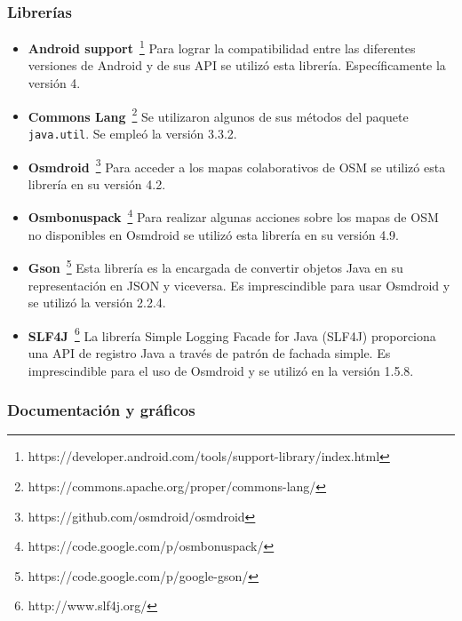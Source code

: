 \subsubsection{Librerías}

\begin{itemize}
  \item \textbf{Android
    support}~\footnote{https://developer.android.com/tools/support-library/index.html} Para lograr
    la compatibilidad entre las diferentes versiones de Android y de sus \acs{API} se utilizó esta
    librería. Específicamente la versión 4.

  \item \textbf{Commons Lang}~\footnote{https://commons.apache.org/proper/commons-lang/} Se
    utilizaron algunos de sus métodos del paquete \texttt{java.util}. Se empleó la versión 3.3.2.

  \item \textbf{Osmdroid}~\footnote{https://github.com/osmdroid/osmdroid} Para acceder a los mapas
    colaborativos de \acs{OSM} se utilizó esta librería en su versión 4.2.

  \item \textbf{Osmbonuspack}~\footnote{https://code.google.com/p/osmbonuspack/} Para realizar
    algunas acciones sobre los mapas de \acs{OSM} no disponibles en Osmdroid se utilizó esta
    librería en su versión 4.9.

  \item \textbf{Gson}~\footnote{https://code.google.com/p/google-gson/} Esta librería es la
    encargada de convertir objetos Java en su representación en JSON y viceversa. Es imprescindible
    para usar Osmdroid y se utilizó la versión 2.2.4.

  \item \textbf{SLF4J}~\footnote{http://www.slf4j.org/} La librería Simple Logging Facade for Java
    (SLF4J) proporciona una \acs{API} de registro Java a través de patrón de fachada simple. Es
    imprescindible para el uso de Osmdroid y se utilizó en la versión 1.5.8.

\end{itemize}

\subsubsection{Documentación y gráficos}

